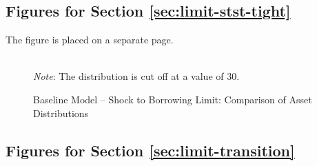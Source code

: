 \documentclass[a4paper,12pt]{article} %
\numberwithin{equation}{section} %
\numberwithin{figure}{section}
\numberwithin{table}{section}
\begin{document}
\begin{refsection}
\begin{appendices}
\subsection{Figures for Section \ref{sec:limit-stst-tight}}
\label{sec-app:figures-limit-tight}

The figure is placed on a separate page.

\begin{sidewaysfigure}
    \caption{Baseline Model -- Shock to Borrowing Limit: Comparison of Asset Distributions}
    \label{fig:comparison-stst-baseline-dist}
    \centering

    \\
     \centering
	\textit{Note}: The distribution is cut off at a value of $30$.
\end{sidewaysfigure}

\subsection{Figures for Section \ref{sec:limit-transition}}
\label{sec-app:figures-limit-transition}


\end{appendices}
\end{refsection}
\end{document}
